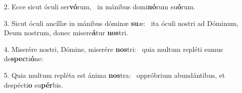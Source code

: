 2. Ecce sicut óculi ser\textbf{vó}rum, \ast\  in mánibus domi\textbf{nó}rum su\textbf{ó}rum.\

3. Sicut óculi ancíllæ in mánibus dóminæ \textbf{su}æ: \ast\  ita óculi nostri ad Dóminum, Deum nostrum, donec misere\textbf{á}tur \textbf{nos}tri.\

4. Miserére nostri, Dómine, miserére \textbf{nos}tri: \ast\  quia multum repléti sumus de\textbf{spec}ti\textbf{ó}ne:\

5. Quia multum repléta est ánima \textbf{nos}tra: \ast\  oppróbrium abundántibus, et despécti\textbf{o} su\textbf{pér}bis.\

